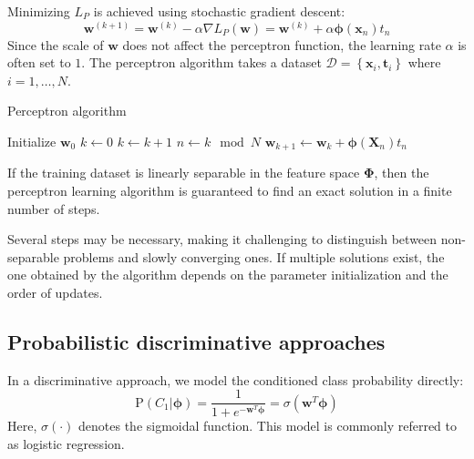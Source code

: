Minimizing $L_P$ is achieved using stochastic gradient descent:
\[\textbf{w}^{(k+1)}=\textbf{w}^{(k)}-\alpha\nabla L_P(\textbf{w})=\textbf{w}^{(k)}+\alpha\boldsymbol{\phi}(\textbf{x}_n)t_n\]
Since the scale of $\textbf{w}$ does not affect the perceptron function, the learning rate $\alpha$ is often set to $1$. 
The perceptron algorithm takes a dataset $\mathcal{D}=\left\{ \textbf{x}_i,\textbf{t}_i  \right\}$ where $i=1,\dots,N$. 
\begin{algorithm}[H]
    \caption{Perceptron algorithm}
        \begin{algorithmic}[1]
            \State Initialize $\textbf{w}_0$
            \State $k \leftarrow 0$
            \Repeat
                \State $k \leftarrow k+1$
                \State $n \leftarrow k \mod N$
                    \State $\textbf{w}_{k+1} \leftarrow \textbf{w}_k + \boldsymbol{\phi}(\textbf{X}_n)t_n$
                \EndIf
        \end{algorithmic}
\end{algorithm}
\begin{theorem}
    If the training dataset is linearly separable in the feature space $\boldsymbol{\Phi}$, then the perceptron learning algorithm is guaranteed to find an exact solution in a finite number of steps.
\end{theorem}
Several steps may be necessary, making it challenging to distinguish between non-separable problems and slowly converging ones. 
If multiple solutions exist, the one obtained by the algorithm depends on the parameter initialization and the order of updates.

\subsection{Probabilistic discriminative approaches}
In a discriminative approach, we model the conditioned class probability directly:
\[\text{P}(C_1|\boldsymbol{\phi})=\dfrac{1}{1+e^{-\textbf{w}^T\boldsymbol{\phi}}}=\sigma(\textbf{w}^T\boldsymbol{\phi})\]
Here, $\sigma(\cdot)$ denotes the sigmoidal function. 
This model is commonly referred to as logistic regression.

